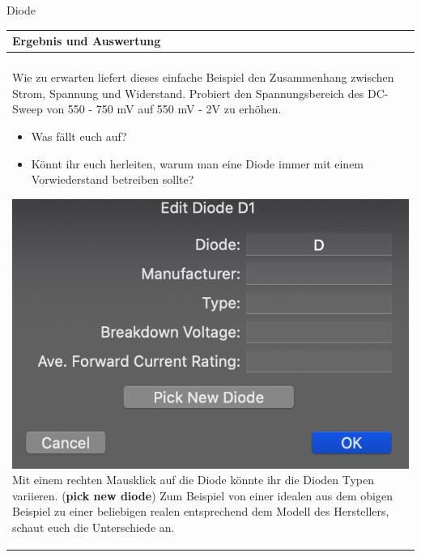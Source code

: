 \begin{frame}[t]{Diode}
      \begin{spacing}{0.9} \begin{tiny}
        \begin{table}[h!]
          \begin{tabular}{p{10cm} }
            \hline
            \textbf{Ergebnis und Auswertung} \\
            \hline \\    
            Wie zu erwarten liefert dieses einfache Beispiel den Zusammenhang zwischen Strom, Spannung und Widerstand. Probiert den Spannungsbereich des
            DC-Sweep von 550 - 750 mV auf 550 mV - 2V zu erhöhen.          
            \begin{itemize}
              \item Was fällt euch auf?
              \item Könnt ihr euch herleiten, warum man eine 
              Diode immer mit einem Vorwiederstand betreiben sollte? 
            \end{itemize}  
            \includegraphics[scale=0.1]{pictures/diode_choice.png} \newline
            Mit einem rechten Mausklick auf die Diode könnte ihr die Dioden Typen variieren. (\textbf{pick new diode})
            Zum Beispiel von einer idealen aus dem obigen Beispiel zu einer beliebigen realen entsprechend dem Modell des Herstellers, schaut euch die Unterschiede an.
          \end{tabular}
        \end{table}
      \end{tiny} \end{spacing}
      
       \end{frame}
